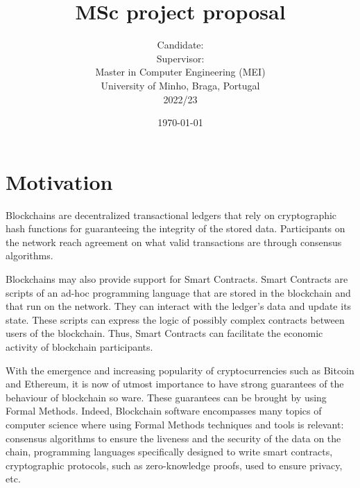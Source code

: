 \documentclass[a4paper, 11pt]{article} %
\title{\textbf{MSc project proposal}\\ \vspace{0.5cm}\msctitle}
\author{
	  Candidate:  \textsc{\msccandidate}
	\\Supervisor: \textsc{\mscsupervisor}
	\\
	\vspace{0.5cm}
    \normalsize{Master in Computer Engineering (MEI)\\ University of Minho, Braga, Portugal}
    \\ 2022/23
    } %
\date{\today}
\makeatletter
\renewcommand{\maketitle}{ %
\begin{center} %
{\LARGE\@title} %

\vspace{50pt} %

{\large\@author} %

\vspace{40pt} %
\end{center}
}
\makeatother
\begin{document}
\maketitle %






\section*{Motivation}

Blockchains are decentralized transactional ledgers that rely on cryptographic hash functions for guaranteeing the integrity of the stored data. Participants on the network reach agreement on what valid transactions are through consensus algorithms.

Blockchains may also provide support for Smart Contracts. Smart Contracts are scripts of an ad-hoc programming language that are stored in the blockchain and that run on the network. They can interact with the ledger’s data and update its state. These scripts can express the logic of possibly complex contracts between users of the blockchain. Thus, Smart Contracts can facilitate the economic activity of blockchain participants.

With the emergence and increasing popularity of cryptocurrencies such as Bitcoin and Ethereum, it is now of utmost importance to have strong guarantees of the behaviour of blockchain so ware. These guarantees can be brought by using Formal Methods. Indeed, Blockchain software encompasses many topics of computer science where using Formal Methods techniques and tools is relevant: consensus algorithms to ensure the liveness and the security of the data on the chain, programming languages specifically designed to write smart contracts, cryptographic protocols, such as zero-knowledge proofs, used to ensure privacy, etc.
\end{document}
